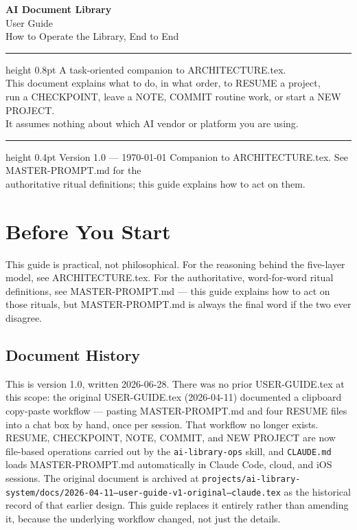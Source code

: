 \documentclass[12pt,letterpaper]{article}
\begin{document}
\begin{titlepage}
\centering
\vspace*{1in}
{\Huge\bfseries AI Document Library}\\[10pt]
{\Large User Guide}\\[8pt]
{\large How to Operate the Library, End to End}\\[20pt]
\hrule height 0.8pt
\vspace{14pt}
{\normalsize
A task-oriented companion to ARCHITECTURE.tex.\\[8pt]
This document explains what to do, in what order, to RESUME a project,\\
run a CHECKPOINT, leave a NOTE, COMMIT routine work, or start a NEW PROJECT.\\
It assumes nothing about which AI vendor or platform you are using.
}
\vspace{14pt}
\hrule height 0.4pt
\vspace{28pt}
{\small Version 1.0 \quad --- \quad \today}
\vfill
{\footnotesize Companion to ARCHITECTURE.tex. See MASTER-PROMPT.md for the\\
authoritative ritual definitions; this guide explains how to act on them.}
\end{titlepage}

\tableofcontents
\newpage

\section{Before You Start}

This guide is practical, not philosophical. For the reasoning behind the
five-layer model, see ARCHITECTURE.tex. For the authoritative, word-for-word
ritual definitions, see MASTER-PROMPT.md --- this guide explains how to act
on those rituals, but MASTER-PROMPT.md is always the final word if the two
ever disagree.

\subsection{Document History}

This is version 1.0, written 2026-06-28. There was no prior USER-GUIDE.tex
at this scope: the original USER-GUIDE.tex (2026-04-11) documented a
clipboard copy-paste workflow --- pasting MASTER-PROMPT.md and four RESUME
files into a chat box by hand, once per session. That workflow no longer
exists. RESUME, CHECKPOINT, NOTE, COMMIT, and NEW PROJECT are now file-based
operations carried out by the \texttt{ai-library-ops} skill, and
\texttt{CLAUDE.md} loads MASTER-PROMPT.md automatically in Claude Code,
cloud, and iOS sessions. The original document is archived at
\texttt{projects/ai-library-system/docs/2026-04-11--user-guide-v1-original--claude.tex}
as the historical record of that earlier design. This guide replaces it
entirely rather than amending it, because the underlying workflow changed,
not just the details.
\end{document}
